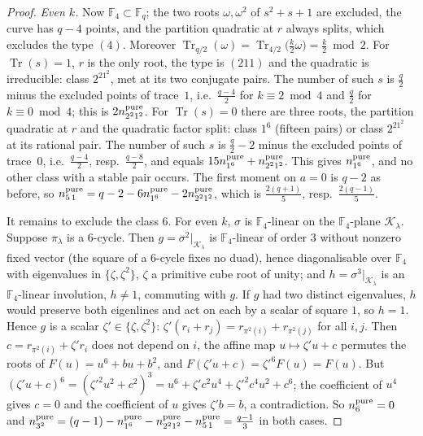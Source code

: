 \documentclass[12pt,a4paper]{amsart}
\theoremstyle{definition}
\newcommand{\F}{\mathbb{F}}
\newcommand{\Tr}{\operatorname{Tr}}
\newcommand{\Kk}{\mathcal{K}}
\begin{document}
\begin{proof}
\emph{Even $k$.} Now $\F_4\subset\F_q$; the two roots $\omega,\omega^2$ of $s^2+s+1$ are excluded, the curve has $q-4$ points, and the partition quadratic at $r$ always splits, which excludes the type $(4)$. Moreover $\Tr_{q/2}(\omega)=\Tr_{4/2}\bigl(\tfrac k2\omega\bigr)=\tfrac k2\bmod2$. For $\Tr(s)=1$, $r$ is the only root, the type is $(211)$ and the quadratic is irreducible: class $2^21^2$, met at its two conjugate pairs. The number of such $s$ is $\frac q2$ minus the excluded points of trace~$1$, i.e.\ $\frac{q-4}2$ for $k\equiv2\bmod4$ and $\frac q2$ for $k\equiv0\bmod4$; this is $2n^{\rm pure}_{2^21^2}$. For $\Tr(s)=0$ there are three roots, the partition quadratic at $r$ and the quadratic factor split: class $1^6$ (fifteen pairs) or class $2^21^2$ at its rational pair. The number of such $s$ is $\frac q2-2$ minus the excluded points of trace~$0$, i.e.\ $\frac{q-4}2$, resp.\ $\frac{q-8}2$, and equals $15n^{\rm pure}_{1^6}+n^{\rm pure}_{2^21^2}$. This gives $n^{\rm pure}_{1^6}$, and no other class with a stable pair occurs. The first moment on $a=0$ is $q-2$ as before, so $n^{\rm pure}_{5\,1}=q-2-6n^{\rm pure}_{1^6}-2n^{\rm pure}_{2^21^2}$, which is $\frac{2(q+1)}5$, resp.\ $\frac{2(q-1)}5$.

It remains to exclude the class $6$. For even $k$, $\sigma$ is $\F_4$-linear on the $\F_4$-plane $\Kk_\lambda$. Suppose $\pi_\lambda$ is a $6$-cycle. Then $g=\sigma^2|_{\Kk_\lambda}$ is $\F_4$-linear of order $3$ without nonzero fixed vector (the square of a $6$-cycle fixes no duad), hence diagonalisable over $\F_4$ with eigenvalues in $\{\zeta,\zeta^2\}$, $\zeta$ a primitive cube root of unity; and $h=\sigma^3|_{\Kk_\lambda}$ is an $\F_4$-linear involution, $h\ne1$, commuting with $g$. If $g$ had two distinct eigenvalues, $h$ would preserve both eigenlines and act on each by a scalar of square $1$, so $h=1$. Hence $g$ is a scalar $\zeta'\in\{\zeta,\zeta^2\}$: $\zeta'(r_i+r_j)=r_{\pi^2(i)}+r_{\pi^2(j)}$ for all $i,j$. Then $c=r_{\pi^2(i)}+\zeta'r_i$ does not depend on $i$, the affine map $u\mapsto\zeta'u+c$ permutes the roots of $F(u)=u^6+bu+b^2$, and $F(\zeta'u+c)=\zeta'^6F(u)=F(u)$. But $(\zeta'u+c)^6=(\zeta'^2u^2+c^2)^3=u^6+\zeta'c^2u^4+\zeta'^2c^4u^2+c^6$; the coefficient of $u^4$ gives $c=0$ and the coefficient of $u$ gives $\zeta'b=b$, a contradiction. So $n^{\rm pure}_6=0$ and $n^{\rm pure}_{3^2}=(q-1)-n^{\rm pure}_{1^6}-n^{\rm pure}_{2^21^2}-n^{\rm pure}_{5\,1}=\frac{q-1}3$ in both cases.
\end{proof}
\end{document}
